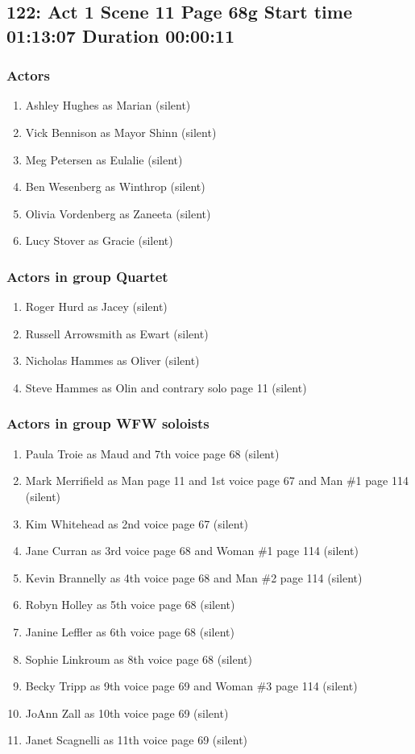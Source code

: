 \subsection{122: Act 1 Scene 11 Page 68g Start time 01:13:07 Duration 00:00:11}

\subsubsection{Actors}
\begin{enumerate}
\item Ashley Hughes as Marian (silent)
\item Vick Bennison as Mayor Shinn (silent)
\item Meg Petersen as Eulalie (silent)
\item Ben Wesenberg as Winthrop (silent)
\item Olivia Vordenberg as Zaneeta (silent)
\item Lucy Stover as Gracie (silent)
\end{enumerate}
\subsubsection{Actors in group Quartet}
\begin{enumerate}
\item Roger Hurd as Jacey (silent)
\item Russell Arrowsmith as Ewart (silent)
\item Nicholas Hammes as Oliver (silent)
\item Steve Hammes as Olin and contrary solo page 11 (silent)
\end{enumerate}
\subsubsection{Actors in group WFW soloists}
\begin{enumerate}
\item Paula Troie as Maud and 7th voice page 68 (silent)
\item Mark Merrifield as Man page 11 and 1st voice page 67 and Man \#1 page 114 (silent)
\item Kim Whitehead as 2nd voice page 67 (silent)
\item Jane Curran as 3rd voice page 68 and Woman \#1 page 114 (silent)
\item Kevin Brannelly as 4th voice page 68 and Man \#2 page 114 (silent)
\item Robyn Holley as 5th voice page 68 (silent)
\item Janine Leffler as 6th voice page 68 (silent)
\item Sophie Linkroum as 8th voice page 68 (silent)
\item Becky Tripp as 9th voice page 69 and Woman \#3 page 114 (silent)
\item JoAnn Zall as 10th voice page 69 (silent)
\item Janet Scagnelli as 11th voice page 69 (silent)
\end{enumerate}

